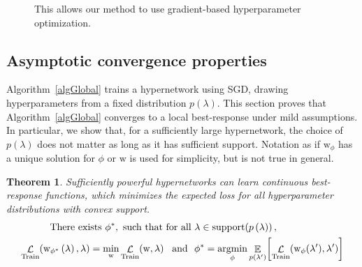 \documentclass{article} %
\newcommand{\argmin}{\mathop{\mathrm{argmin}}\limits}
\newtheorem{theorem}{Theorem}[section]
\newcommand{\param}{\mathrm{w}} %
\newcommand{\hyper}{\lambda} %
\newcommand{\hyperHyper}{\hyper'} %
\newcommand{\innerOptParam}[1]{\param^{*} \! \left( #1 \right)} %
\newcommand{\lossSymbol}{\mathop{\mathcal{L}}} %
\newcommand{\lossSymbolInner}{\lossSymbol_{\mathrm{Train}}} %
\newcommand{\lossSymbolOuter}{\lossSymbol_{\mathrm{Valid.}}} %
\newcommand{\innerLoss}[2]{\lossSymbolInner \! \left( #1, #2 \right)} %
\newcommand{\outerLoss}[1]{\lossSymbolOuter \! \left( #1 \right)}%
\newcommand{\responseParam}{\phi} %
\newcommand{\approxResponseSymbol}[1]{\param_{#1}} %
\newcommand{\approxResponse}[2]{\approxResponseSymbol{#2} ( #1 )} %
\newcommand{\argminTargetVary}{\responseParam}%
\newcommand{\argminTargetFix}{\responseParam}%
\newcommand{\approxResponseOutput}[1]{\approxResponseSymbol{\responseParam^{*}} ( #1 )}
\newcommand{\proofLoss}{\innerLoss{\approxResponse{\hyper}{\responseParam}}{\hyper}}
\newcommand{\proofTargetLossOutput}{\outerLoss{\approxResponseOutput{\hyper}}}
\newcommand{\targetLoss}{\outerLoss{\innerOptParam{\hyper}}}
\newcommand{\phyper}{p \left( \hyper \right)}
\newcommand{\hyperSupport}{\mathrm{support} \! \left( \phyper \right)} %
\newcommand{\hyperDomain}{\textnormal{for all } \hyper \in \hyperSupport}
\newcommand{\Ehyper}[1]{\mathop{\mathbb{E}}_{\phyper} \! \left[ #1 \right]}
\newcommand{\rename}[1]{#1'}
\newcommand{\EhyperFix}[1]{\mathop{\mathbb{E}}_{p \left( \rename{\hyper} \right)} \! \left[ #1 \right]}
\newcommand{\proofLossFix}{\innerLoss{\approxResponse{\rename{\hyper}}{\responseParam}}{\rename{\hyper}}}
\begin{document}
\begin{figure}[t]
{This allows our method to use gradient-based hyperparameter optimization.
}
\vspace{-0.02\textwidth}
\label{compare with cv}
\end{figure}


\subsection{Asymptotic convergence properties}
Algorithm~\ref{algGlobal} trains a hypernetwork using SGD, drawing hyperparameters from a fixed distribution $p(\lambda)$.
This section proves that Algorithm~\ref{algGlobal} converges to a local best-response under mild assumptions.
In particular, we show that, for a sufficiently large hypernetwork, the choice of $p(\lambda)$ does not matter as long as it has sufficient support.
Notation as if $\param_{\responseParam}$ has a unique solution for $\responseParam$ or $\param$ is used for simplicity, but is not true in general.
% 
%
\begin{theorem}
\label{amoritizedExactness}
Sufficiently powerful hypernetworks can learn continuous best-response functions, which minimizes the expected loss for all hyperparameter distributions with convex support.
%
\begin{align*}
\textnormal{There exists } \responseParam^{*}, \textnormal{ such that } \hyperDomain,\!\!\!\!\!\!\!\!\!\!\!\!\!\!\!\!\!\!&\\
\innerLoss{\param_{\responseParam^{*}} \left( \hyper \right)}{\hyper} = \min_{\param} \innerLoss{\param}{\hyper} \textnormal{\,\, and \,\,}\responseParam^{*} = \argmin_{\argminTargetFix} &\EhyperFix{\proofLossFix}
\end{align*}
\end{theorem}
\vspace{-0.02\textheight}
%
\end{document}
